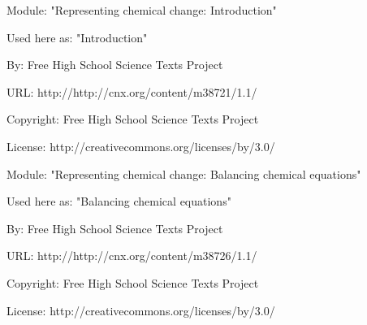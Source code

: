       \par\vspace{9pt}\noindent\begin{minipage}{\textwidth}
      Module: "Representing chemical change: Introduction" \par\nopagebreak\noindent
      Used here as: "Introduction" \par\nopagebreak\noindent
        By: Free High School Science Texts Project\par\nopagebreak\noindent
      URL: http://http://cnx.org/content/m38721/1.1/\par\nopagebreak\noindent
      \par\nopagebreak\noindent
      Copyright: Free High School Science Texts Project\par\nopagebreak\noindent
      License:  http://creativecommons.org/licenses/by/3.0/\par\nopagebreak\noindent
      \par\end{minipage}
      \par\vspace{9pt}\noindent\begin{minipage}{\textwidth}
      Module: "Representing chemical change: Balancing chemical equations" \par\nopagebreak\noindent
      Used here as: "Balancing chemical equations" \par\nopagebreak\noindent
        By: Free High School Science Texts Project\par\nopagebreak\noindent
      URL: http://http://cnx.org/content/m38726/1.1/\par\nopagebreak\noindent
      \par\nopagebreak\noindent
      Copyright: Free High School Science Texts Project\par\nopagebreak\noindent
      License:  http://creativecommons.org/licenses/by/3.0/\par\nopagebreak\noindent
      \par\end{minipage}
